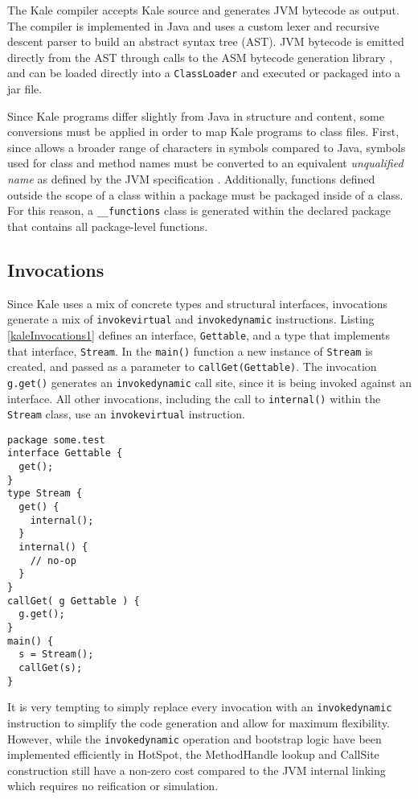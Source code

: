 The Kale compiler accepts Kale source and generates JVM bytecode as output.  The compiler is implemented in Java and uses a custom lexer and recursive descent parser to build an abstract syntax tree (AST).  JVM bytecode is emitted directly from the AST through calls to the ASM bytecode generation library \cite{asm-library}, and can be loaded directly into a \texttt{ClassLoader} and executed or packaged into a jar file.

Since Kale programs differ slightly from Java in structure and content, some conversions must be applied in order to map Kale programs to class files.  First, since allows a broader range of characters in symbols compared to Java, symbols used for class and method names must be converted to an equivalent \emph{unqualified name} as defined by the JVM specification \cite[4.2.2]{jvms7}.  Additionally, functions defined outside the scope of a class within a package must be packaged inside of a class.  For this reason, a \texttt{\_\_functions} class is generated within the declared package that contains all package-level functions.

\subsection{Invocations}

Since Kale uses a mix of concrete types and structural interfaces, invocations generate a mix of \texttt{invokevirtual} and \texttt{invokedynamic} instructions.  Listing \ref{kaleInvocations1} defines an interface, \texttt{Gettable}, and a type that implements that interface, \texttt{Stream}.  In the \texttt{main()} function a new instance of \texttt{Stream} is created, and passed as a parameter to \texttt{callGet(Gettable)}.  The invocation \texttt{g.get()} generates an \texttt{invokedynamic} call site, since it is being invoked against an interface.  All other invocations, including the call to \texttt{internal()} within the \texttt{Stream} class, use an \texttt{invokevirtual} instruction.

\begin{lstlisting}[language=Kale,caption=Invocations in Kale,label=kaleInvocations1]
package some.test
interface Gettable {
  get();
}
type Stream {
  get() {
    internal();
  }
  internal() {
    // no-op
  }
}
callGet( g Gettable ) {
  g.get();
}
main() {
  s = Stream();
  callGet(s);
}
\end{lstlisting}

It is very tempting to simply replace every invocation with an \texttt{invokedynamic} instruction to simplify the code generation and allow for maximum flexibility.  However, while the \texttt{invokedynamic} operation and bootstrap logic have been implemented efficiently in HotSpot, the MethodHandle lookup and CallSite construction still have a non-zero cost compared to the JVM internal linking which requires no reification or simulation.

